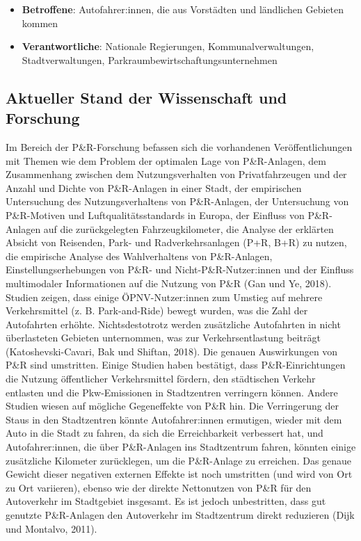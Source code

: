\documentclass[
]{book}
\providecommand{\tightlist}{%
  \setlength{\itemsep}{0pt}\setlength{\parskip}{0pt}}
\begin{document}
\begin{itemize}
\tightlist
\item
  \textbf{Betroffene}: Autofahrer:innen, die aus Vorstädten und ländlichen Gebieten kommen
\item
  \textbf{Verantwortliche}: Nationale Regierungen, Kommunalverwaltungen, Stadtverwaltungen, Parkraumbewirtschaftungsunternehmen
\end{itemize}

\hypertarget{aktueller-stand-der-wissenschaft-und-forschung-25}{%
\subsection*{Aktueller Stand der Wissenschaft und Forschung}\label{aktueller-stand-der-wissenschaft-und-forschung-25}}

Im Bereich der P\&R-Forschung befassen sich die vorhandenen Veröffentlichungen mit Themen wie dem Problem der optimalen Lage von P\&R-Anlagen, dem Zusammenhang zwischen dem Nutzungsverhalten von Privatfahrzeugen und der Anzahl und Dichte von P\&R-Anlagen in einer Stadt, der empirischen Untersuchung des Nutzungsverhaltens von P\&R-Anlagen, der Untersuchung von P\&R-Motiven und Luftqualitätsstandards in Europa, der Einfluss von P\&R-Anlagen auf die zurückgelegten Fahrzeugkilometer, die Analyse der erklärten Absicht von Reisenden, Park- und Radverkehrsanlagen (P+R, B+R) zu nutzen, die empirische Analyse des Wahlverhaltens von P\&R-Anlagen, Einstellungserhebungen von P\&R- und Nicht-P\&R-Nutzer:innen und der Einfluss multimodaler Informationen auf die Nutzung von P\&R (Gan und Ye, 2018).
Studien zeigen, dass einige ÖPNV-Nutzer:innen zum Umstieg auf mehrere Verkehrsmittel (z. B. Park-and-Ride) bewegt wurden, was die Zahl der Autofahrten erhöhte. Nichtsdestotrotz werden zusätzliche Autofahrten in nicht überlasteten Gebieten unternommen, was zur Verkehrsentlastung beiträgt (Katoshevski-Cavari, Bak und Shiftan, 2018).
Die genauen Auswirkungen von P\&R sind umstritten. Einige Studien haben bestätigt, dass P\&R-Einrichtungen die Nutzung öffentlicher Verkehrsmittel fördern, den städtischen Verkehr entlasten und die Pkw-Emissionen in Stadtzentren verringern können. Andere Studien wiesen auf mögliche Gegeneffekte von P\&R hin. Die Verringerung der Staus in den Stadtzentren könnte Autofahrer:innen ermutigen, wieder mit dem Auto in die Stadt zu fahren, da sich die Erreichbarkeit verbessert hat, und Autofahrer:innen, die über P\&R-Anlagen ins Stadtzentrum fahren, könnten einige zusätzliche Kilometer zurücklegen, um die P\&R-Anlage zu erreichen. Das genaue Gewicht dieser negativen externen Effekte ist noch umstritten (und wird von Ort zu Ort variieren), ebenso wie der direkte Nettonutzen von P\&R für den Autoverkehr im Stadtgebiet insgesamt. Es ist jedoch unbestritten, dass gut genutzte P\&R-Anlagen den Autoverkehr im Stadtzentrum direkt reduzieren (Dijk und Montalvo, 2011).
\end{document}
